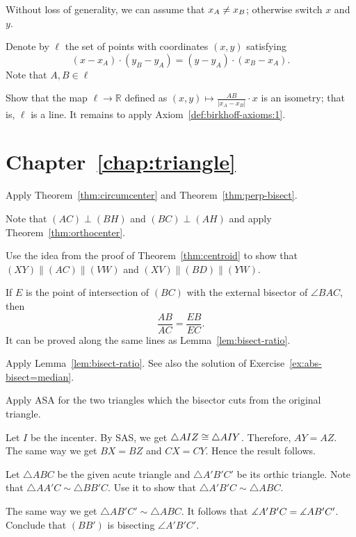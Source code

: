 Without loss of generality, we can assume that $x_A\z\ne x_B$;
otherwise switch $x$ and~$y$.

Denote by $\ell$ the set of points with coordinates $(x,y)$ satisfying
\[(x-x_A)\cdot (y_B-y_A)=(y-y_A)\cdot (x_B-x_A).\]
Note that $A, B\in \ell$

Show that the map $\ell\to \mathbb{R}$ defined as
$(x,y)\mapsto \tfrac{AB}{|x_A-x_B|}\cdot x$ is an isometry;
that is, $\ell$ is a line.
It remains to apply Axiom~\ref{def:birkhoff-axioms:1}.


\section*{Chapter~\ref{chap:triangle}}
\setcounter{eqtn}{0}

Apply Theorem~\ref{thm:circumcenter} and Theorem~\ref{thm:perp-bisect}.


Note that $(AC)\perp (BH)$ and $(BC)\perp (AH)$ and apply Theorem~\ref{thm:orthocenter}.




Use the idea from the proof of Theorem~\ref{thm:centroid}
to show that $(XY)\parallel (AC)\parallel (VW)$ and
$(XV)\parallel (BD)\parallel (YW)$.


If $E$ is the point of intersection of $(BC)$ 
with the external bisector of $\angle BAC$, then 
$$\frac{AB}{AC}=\frac{EB}{EC}.$$
It can be proved along the same lines as Lemma~\ref{lem:bisect-ratio}.

Apply Lemma~\ref{lem:bisect-ratio}.
See also the solution of Exercise~\ref{ex:abs-bisect=median}.


Apply ASA for the two triangles which the bisector cuts from the original triangle. 

Let $I$ be the incenter.
By SAS, we get $\triangle AIZ\z\cong\triangle AIY$. Therefore, $AY=AZ$.
The same way we get $BX=BZ$ and $CX=CY$.
Hence the result follows.

Let $\triangle ABC$ be the given acute triangle and $\triangle A'B'C'$ 
be its orthic triangle.
Note that $\triangle AA'C\sim\triangle BB'C$.
Use it to show that $\triangle A'B'C\sim \triangle ABC$.

The same way we get $\triangle AB'C'\sim \triangle ABC$.
It follows that $\measuredangle A'B'C\z=\measuredangle AB'C'$.
Conclude that $(BB')$ is bisecting $\angle A'B'C'$.


